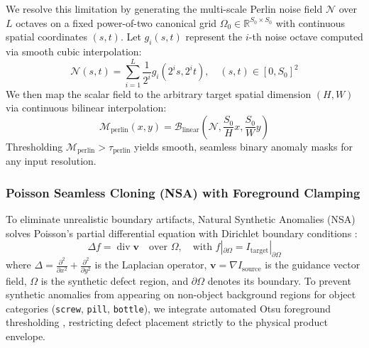 We resolve this limitation by generating the multi-scale Perlin noise field $\mathcal{N}$ over $L$ octaves on a fixed power-of-two canonical grid $\Omega_0 \in \mathbb{R}^{S_0 \times S_0}$ with continuous spatial coordinates $(s, t)$. Let $g_i(s, t)$ represent the $i$-th noise octave computed via smooth cubic interpolation:
\begin{equation}
\mathcal{N}(s, t) = \sum_{i=1}^L \frac{1}{2^i} g_i(2^i s, 2^i t), \quad (s, t) \in [0, S_0]^2
\end{equation}
We then map the scalar field to the arbitrary target spatial dimension $(H, W)$ via continuous bilinear interpolation:
\begin{equation}
\mathcal{M}_{\text{perlin}}(x, y) = \mathcal{B}_{\text{linear}}\left(\mathcal{N}, \frac{S_0}{H} x, \frac{S_0}{W} y\right)
\end{equation}
Thresholding $\mathcal{M}_{\text{perlin}} > \tau_{\text{perlin}}$ yields smooth, seamless binary anomaly masks for any input resolution.

\subsubsection{Poisson Seamless Cloning (NSA) with Foreground Clamping}
To eliminate unrealistic boundary artifacts, Natural Synthetic Anomalies (NSA) \cite{schluter2022natural} solves Poisson's partial differential equation with Dirichlet boundary conditions \cite{perez2003poisson}:
\begin{equation}
\Delta f = \operatorname{div} \mathbf{v} \quad \text{over } \Omega, \quad \text{with } f|_{\partial \Omega} = I_{\text{target}}|_{\partial \Omega}
\end{equation}
where $\Delta = \frac{\partial^2}{\partial x^2} + \frac{\partial^2}{\partial y^2}$ is the Laplacian operator, $\mathbf{v} = \nabla I_{\text{source}}$ is the guidance vector field, $\Omega$ is the synthetic defect region, and $\partial \Omega$ denotes its boundary. To prevent synthetic anomalies from appearing on non-object background regions for object categories (\texttt{screw}, \texttt{pill}, \texttt{bottle}), we integrate automated Otsu foreground thresholding \cite{otsu1979threshold}, restricting defect placement strictly to the physical product envelope.

